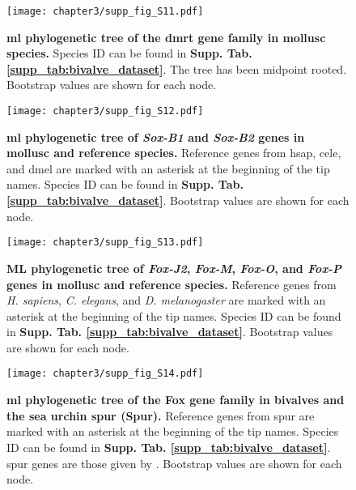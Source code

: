 \documentclass[../main.tex]{subfiles}
\begin{document}
\begin{figure}[ht]
	\centering
	\texttt{[image: chapter3/supp\_fig\_S11.pdf]}
	\captionsetup{width=\textwidth}
	\caption{
		\textbf{\gls{ml} phylogenetic tree of the \gls{dmrt} gene family in mollusc species.} Species ID can be found in \textbf{Supp. Tab. \ref{supp_tab:bivalve_dataset}}. The tree has been midpoint rooted. Bootstrap values are shown for each node.
	}
	\label{suppFig:dmrt_molluscOnly}
\end{figure}

\begin{figure}[ht]
	\centering
	\texttt{[image: chapter3/supp\_fig\_S12.pdf]}
	\captionsetup{width=\textwidth}
	\caption{
		\textbf{\gls{ml} phylogenetic tree of \textit{Sox-B1} and \textit{Sox-B2} genes in mollusc and reference species.} Reference genes from \gls{hsap}, \gls{cele}, and \gls{dmel} are marked with an asterisk at the beginning of the tip names. Species ID can be found in \textbf{Supp. Tab. \ref{supp_tab:bivalve_dataset}}. Bootstrap values are shown for each node.
	}
	\label{suppFig:sox_B12}
\end{figure}

\begin{figure}[ht]
	\centering
	\texttt{[image: chapter3/supp\_fig\_S13.pdf]}
	\captionsetup{width=\textwidth}
	\caption{
		\textbf{ML phylogenetic tree of \textit{Fox-J2}, \textit{Fox-M}, \textit{Fox-O}, and \textit{Fox-P} genes in mollusc and reference species.} Reference genes from \textit{H. sapiens}, \textit{C. elegans}, and \textit{D. melanogaster} are marked with an asterisk at the beginning of the tip names. Species ID can be found in \textbf{Supp. Tab. \ref{supp_tab:bivalve_dataset}}. Bootstrap values are shown for each node.
	}
	\label{suppFig:fox_JMOP}
\end{figure}

\begin{figure}[ht]
	\centering
	\texttt{[image: chapter3/supp\_fig\_S14.pdf]}
	\captionsetup{width=\textwidth}
	\caption{
		\textbf{\gls{ml} phylogenetic tree of the Fox gene family in bivalves and the sea urchin \gls{spur} (Spur).} Reference genes from \gls{spur} are marked with an asterisk at the beginning of the tip names. Species ID can be found in \textbf{Supp. Tab. \ref{supp_tab:bivalve_dataset}}. \gls{spur} genes are those given by \textbf{\cite{tu2006sea}}. Bootstrap values are shown for each node.
	}
	\label{suppFig:fox_spur}
\end{figure}
\end{document}

